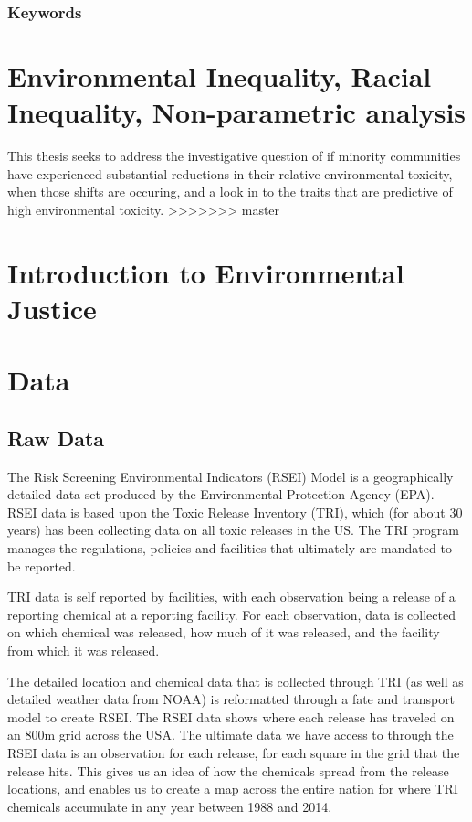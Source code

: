 \documentclass[12pt,twoside]{dukestatscithesis}
\theoremstyle{definition}
\theoremstyle{definition}
\theoremstyle{definition}
\theoremstyle{remark}
\begin{document}
\subsection{Keywords}\label{keywords}

\chapter{Environmental Inequality, Racial Inequality, Non-parametric
analysis}\label{environmental-inequality-racial-inequality-non-parametric-analysis}

This thesis seeks to address the investigative question of if minority
communities have experienced substantial reductions in their relative
environmental toxicity, when those shifts are occuring, and a look in to
the traits that are predictive of high environmental toxicity.
\textgreater{}\textgreater{}\textgreater{}\textgreater{}\textgreater{}\textgreater{}\textgreater{}
master

\chapter{Introduction to Environmental Justice}\label{rmd-basics}

\chapter{Data}\label{math}

\section{Raw Data}\label{raw-data}

The Risk Screening Environmental Indicators (RSEI) Model is a
geographically detailed data set produced by the Environmental
Protection Agency (EPA). RSEI data is based upon the Toxic Release
Inventory (TRI), which (for about 30 years) has been collecting data on
all toxic releases in the US. The TRI program manages the regulations,
policies and facilities that ultimately are mandated to be reported.

TRI data is self reported by facilities, with each observation being a
release of a reporting chemical at a reporting facility. For each
observation, data is collected on which chemical was released, how much
of it was released, and the facility from which it was released.

The detailed location and chemical data that is collected through TRI
(as well as detailed weather data from NOAA) is reformatted through a
fate and transport model to create RSEI. The RSEI data shows where each
release has traveled on an 800m grid across the USA. The ultimate data
we have access to through the RSEI data is an observation for each
release, for each square in the grid that the release hits. This gives
us an idea of how the chemicals spread from the release locations, and
enables us to create a map across the entire nation for where TRI
chemicals accumulate in any year between 1988 and 2014.
\end{document}
